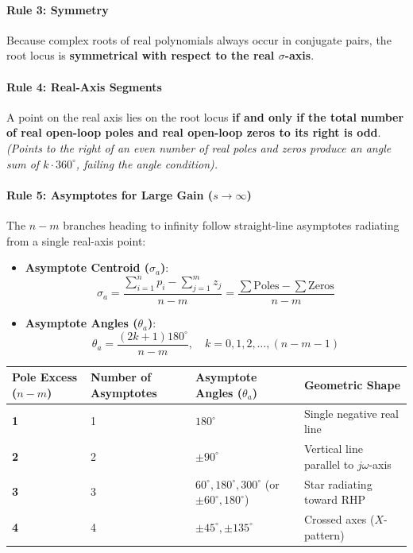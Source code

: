 \documentclass[12pt,onecolumn,twoside ]{article}
\begin{document}
	\paragraph{Rule 3: Symmetry}
	Because complex roots of real polynomials always occur in conjugate pairs, the root locus is \textbf{symmetrical with respect to the real $\sigma$-axis}.
	\paragraph{Rule 4: Real-Axis Segments}
	A point on the real axis lies on the root locus \textbf{if and only if the total number of real open-loop poles and real open-loop zeros to its right is odd}. \textit{(Points to the right of an even number of real poles and zeros produce an angle sum of $k \cdot 360^\circ$, failing the angle condition).}
	\paragraph{Rule 5: Asymptotes for Large Gain ($s \to \infty$)}
	The $n - m$ branches heading to infinity follow straight-line asymptotes radiating from a single real-axis point:
	\begin{itemize}
		\item
		\textbf{Asymptote Centroid ($\sigma_a$)}: \[
		\sigma_a = \frac{\sum_{i=1}^{n} p_i - \sum_{j=1}^{m} z_j}{n - m} = \frac{\sum \text{Poles} - \sum \text{Zeros}}{n - m}
		\]
		\item
		\textbf{Asymptote Angles ($\theta_a$)}: \[
		\theta_a = \frac{(2k + 1)180^\circ}{n - m}, \quad k = 0, 1, 2, \dots, (n - m - 1)
		\]
	\end{itemize}
	\begin{center}\small\begin{tabularx}{\textwidth}{*{4}{Y}}
			\toprule
			\textbf{Pole Excess ($n - m$)} & \textbf{Number of Asymptotes} & \textbf{Asymptote Angles ($\theta_a$)} & \textbf{Geometric Shape} \\
			\midrule
			\textbf{1} & 1 & $180^\circ$ & Single negative real line \\
			\textbf{2} & 2 & $\pm 90^\circ$ & Vertical line parallel to $j\omega$-axis \\
			\textbf{3} & 3 & $60^\circ, 180^\circ, 300^\circ$ (or $\pm 60^\circ, 180^\circ$) & Star radiating toward RHP \\
			\textbf{4} & 4 & $\pm 45^\circ, \pm 135^\circ$ & Crossed axes ($X$-pattern) \\
			\bottomrule
	\end{tabularx}\end{center}
\end{document}
